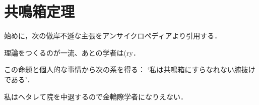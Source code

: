 \section{共鳴箱定理}
	始めに，次の傲岸不遜な主張をアンサイクロペディアより引用する．
	
	\begin{screen}
		\begin{prp}
			理論をつくるのが一流、あとの学者は(ry．
		\end{prp}
	\end{screen}
	この命題と個人的な事情から次の系を得る：
	`私は共鳴箱にすらなれない腑抜けである'．
	\begin{prf}
		私はヘタレて院を中退するので金輪際学者になりえない．
		\QED
	\end{prf}